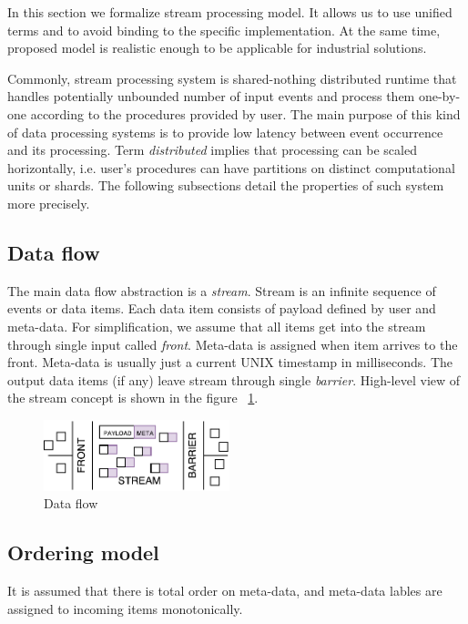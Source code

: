 
\label {fs-stream}

In this section we formalize stream processing model. It allows us to use unified terms and to avoid binding to the specific implementation. At the same time, proposed model is realistic enough to be applicable  for industrial solutions.

Commonly, stream processing system is shared-nothing distributed runtime that handles potentially unbounded number of input events and process them one-by-one according to the procedures provided by user. The main purpose of this kind of data processing systems is to provide low latency between event occurrence and its processing. Term {\it distributed} %
implies 
 that processing can be scaled horizontally, i.e. user's procedures can have partitions on distinct computational units or shards. The following subsections detail the properties of such system more precisely.  

\subsection{Data flow}
The main data flow abstraction is a {\it stream}. Stream is an infinite sequence of events or data items. Each data item consists of payload defined by user and meta-data. For simplification, we assume that all items get into the stream through single input called {\it front}. Meta-data is assigned when item arrives to the front. Meta-data is usually just a current UNIX timestamp in milliseconds. The output data items (if any) leave stream through single {\it barrier}. High-level view of the stream concept is shown in the figure ~\ref{data-flow}.

\begin{figure}[htbp]
  \centering
  \includegraphics[width=0.48\textwidth]{pics/stream}
  \caption{Data flow}
  \label {data-flow}
\end{figure}

\subsection{Ordering model}
It is assumed  that there is total order on meta-data, and meta-data lables are  assigned to incoming items  monotonically.

